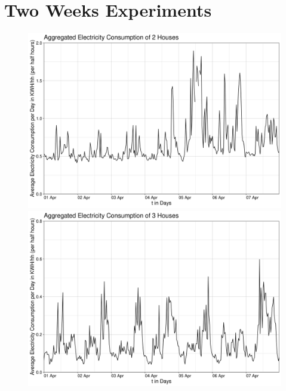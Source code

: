 \chapter{Two Weeks Experiments}
\enlargethispage{10}
\vspace*{-10\baseline}
\begin{figure}[!Hhtp]
\centering
\includegraphics[width=0.8\columnwidth]{images/Aggregated Electricity Consumption of 2 Houses6.png}
\caption[Aggregated Electricity Consumption of 2 Houses of the 2nd Experiment]{}
\label{img:2_Houses_weekly}
\centering
\includegraphics[width=0.8\columnwidth]{images/Aggregated Electricity Consumption of 3 Houses5.png}
\caption[Aggregated Electricity Consumption of 3 Houses of the 2nd Experiment]{}
\label{img:3_Houses_weekly}
\end{figure}

